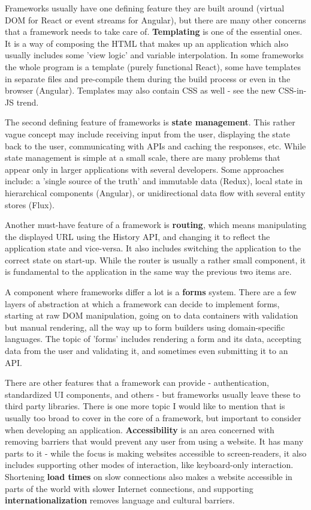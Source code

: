 \documentclass[english,odsaz]{fitthesis}
\begin{document}
Frameworks usually have one defining feature they are built around (virtual DOM
for React or event streams for Angular), but there are many other concerns that
a framework needs to take care of. \textbf{Templating} is one of the essential ones. It
is a way of composing the HTML that makes up an application which also usually
includes some 'view logic' and variable interpolation. In some frameworks the
whole program is a template (purely functional React), some have templates in
separate files and pre-compile them during the build process or even in the
browser (Angular). Templates may also contain CSS as well - see the new
CSS-in-JS trend.

The second defining feature of frameworks is \textbf{state management}. This rather vague
concept may include receiving input from the user, displaying the state back to
the user, communicating with APIs and caching the responses, etc. While state
management is simple at a small scale, there are many problems that appear only
in larger applications with several developers. Some approaches include: a
'single source of the truth' and immutable data (Redux), local state in
hierarchical components (Angular), or unidirectional data flow with several
entity stores (Flux).

Another must-have feature of a framework is \textbf{routing}, which means manipulating
the displayed URL using the History API, and changing it to reflect the
application state and vice-versa. It also includes switching the application to
the correct state on start-up. While the router is usually a rather small
component, it is fundamental to the application in the same way the previous two
items are.

A component where frameworks differ a lot is a \textbf{forms} system. There are a few
layers of abstraction at which a framework can decide to implement forms,
starting at raw DOM manipulation, going on to data containers with validation
but manual rendering, all the way up to form builders using domain-specific
languages. The topic of 'forms' includes rendering a form and its data,
accepting data from the user and validating it, and sometimes even submitting it
to an API.

There are other features that a framework can provide - authentication,
standardized UI components, and others - but frameworks usually leave these to
third party libraries. There is one more topic I would like to mention that is
usually too broad to cover in the core of a framework, but important to consider
when developing an application. \textbf{Accessibility} is an area concerned with removing
barriers that would prevent any user from using a website. It has many parts to
it - while the focus is making websites accessible to screen-readers, it also
includes supporting other modes of interaction, like keyboard-only
interaction. Shortening \textbf{load times} on slow connections also makes a website
accessible in parts of the world with slower Internet connections, and
supporting \textbf{internationalization} removes language and cultural barriers.
\end{document}
